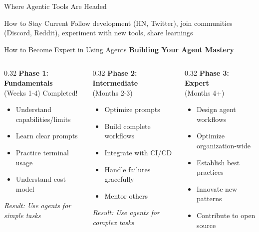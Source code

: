 \documentclass[aspectratio=169,11pt]{beamer}
\begin{document}
\begin{frame}{Where Agentic Tools Are Headed}
    \vspace{0.4cm}
    \begin{block}{How to Stay Current}
        Follow development (HN, Twitter), join communities (Discord, Reddit), experiment with new tools, share learnings
    \end{block}
\end{frame}

\begin{frame}{How to Become Expert in Using Agents}
    \textbf{Building Your Agent Mastery}

    \begin{columns}[T]
        \begin{column}{0.32\textwidth}
            \textbf{Phase 1: Fundamentals}\\
            (Weeks 1-4) \textcolor{UofSCHorseshoe}{\checkmark{} Completed!}
            \begin{itemize}
                \item Understand capabilities/limits
                \item Learn clear prompts
                \item Practice terminal usage
                \item Understand cost model
            \end{itemize}

            \textit{Result: Use agents for simple tasks}
        \end{column}
        \begin{column}{0.32\textwidth}
            \textbf{Phase 2: Intermediate}\\
            (Months 2-3)
            \begin{itemize}
                \item Optimize prompts
                \item Build complete workflows
                \item Integrate with CI/CD
                \item Handle failures gracefully
                \item Mentor others
            \end{itemize}

            \textit{Result: Use agents for complex tasks}
        \end{column}
        \begin{column}{0.32\textwidth}
            \textbf{Phase 3: Expert}\\
            (Months 4+)
            \begin{itemize}
                \item Design agent workflows
                \item Optimize organization-wide
                \item Establish best practices
                \item Innovate new patterns
                \item Contribute to open source
            \end{itemize}


\end{column}
\end{columns}
\end{frame}
\end{document}

